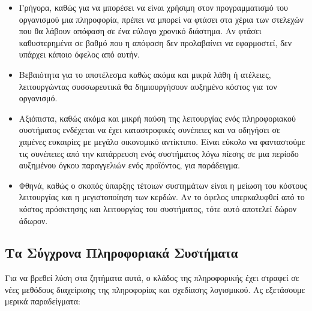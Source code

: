 \documentclass{article}
\begin{document}
\begin{itemize}
\item Γρήγορα, καθώς για να μπορέσει να είναι χρήσιμη στον προγραμματισμό
του οργανισμού μια πληροφορία, πρέπει να μπορεί να φτάσει στα χέρια των
στελεχών που θα λάβουν απόφαση σε ένα εύλογο χρονικό διάστημα. Αν φτάσει
καθυστερημένα σε βαθμό που η απόφαση δεν προλαβαίνει να εφαρμοστεί, δεν
υπάρχει κάποιο όφελος από αυτήν.
\item Βεβαιότητα για το αποτέλεσμα καθώς ακόμα και μικρά λάθη ή ατέλειες,
λειτουργώντας συσσωρευτικά θα δημιουργήσουν αυξημένο κόστος για τον
οργανισμό.
\item Αξιόπιστα, καθώς ακόμα και μικρή παύση της λειτουργίας ενός
πληροφοριακού συστήματος ενδέχεται να έχει καταστροφικές συνέπειες και να
οδηγήσει σε χαμένες ευκαιρίες με μεγάλο οικονομικό αντίκτυπο. Είναι εύκολο
να φανταστούμε τις συνέπειες από την κατάρρευση ενός συστήματος λόγω
πίεσης σε μια περίοδο αυξημένου όγκου παραγγελιών ενός προϊόντος, για
παράδειγμα.
\item Φθηνά, καθώς ο σκοπός ύπαρξης τέτοιων συστημάτων είναι η μείωση του
κόστους λειτουργίας και η μεγιστοποίηση των κερδών. Αν το όφελος
υπερκαλυφθεί από το κόστος πρόσκτησης και λειτουργίας του συστήματος, τότε
αυτό αποτελεί δώρον άδωρον.
\end{itemize}

\subsection{Τα Σύγχρονα Πληροφοριακά Συστήματα}
Για να βρεθεί λύση στα ζητήματα αυτά, ο κλάδος της πληροφορικής έχει
στραφεί σε νέες  μεθόδους διαχείρισης της πληροφορίας και σχεδίασης
λογισμικού. Ας εξετάσουμε μερικά παραδείγματα:
\end{document}
